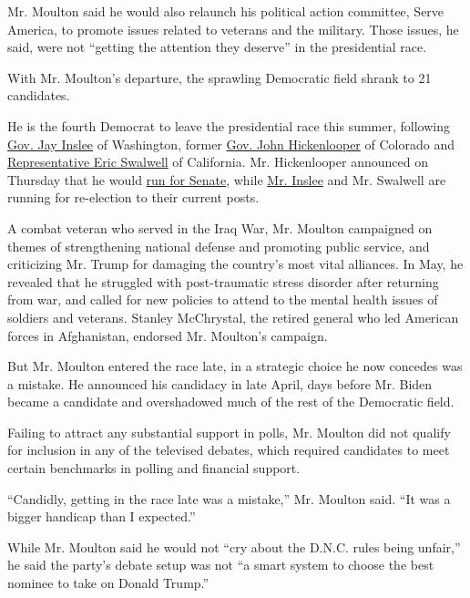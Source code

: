 Mr. Moulton said he would also relaunch his political action committee,
Serve America, to promote issues related to veterans and the military.
Those issues, he said, were not ``getting the attention they deserve''
in the presidential race.

With Mr. Moulton's departure, the sprawling Democratic field shrank to
21 candidates.

He is the fourth Democrat to leave the presidential race this summer,
following
\href{https://www.nytimes.com/2019/08/21/us/politics/jay-inslee-2020-campaign.html}{Gov.
Jay Inslee} of Washington, former
\href{https://www.nytimes.com/2019/08/15/us/politics/john-hickenlooper-drop-out-senate.html}{Gov.
John Hickenlooper} of Colorado and
\href{https://www.nytimes.com/2019/07/08/us/politics/steyer-swalwell-2020.html}{Representative
Eric Swalwell} of California. Mr. Hickenlooper announced on Thursday
that he would
\href{https://www.nytimes.com/2019/08/22/us/politics/john-hickenlooper-senate-2020.html}{run
for Senate}, while
\href{https://www.nytimes.com/2019/08/23/us/politics/jay-inslee.html}{Mr.
Inslee} and Mr. Swalwell are running for re-election to their current
posts.

A combat veteran who served in the Iraq War, Mr. Moulton campaigned on
themes of strengthening national defense and promoting public service,
and criticizing Mr. Trump for damaging the country's most vital
alliances. In May, he revealed that he struggled with post-traumatic
stress disorder after returning from war, and called for new policies to
attend to the mental health issues of soldiers and veterans. Stanley
McChrystal, the retired general who led American forces in Afghanistan,
endorsed Mr. Moulton's campaign.

But Mr. Moulton entered the race late, in a strategic choice he now
concedes was a mistake. He announced his candidacy in late April, days
before Mr. Biden became a candidate and overshadowed much of the rest of
the Democratic field.

Failing to attract any substantial support in polls, Mr. Moulton did not
qualify for inclusion in any of the televised debates, which required
candidates to meet certain benchmarks in polling and financial support.

``Candidly, getting in the race late was a mistake,'' Mr. Moulton said.
``It was a bigger handicap than I expected.''

While Mr. Moulton said he would not ``cry about the D.N.C. rules being
unfair,'' he said the party's debate setup was not ``a smart system to
choose the best nominee to take on Donald Trump.''

